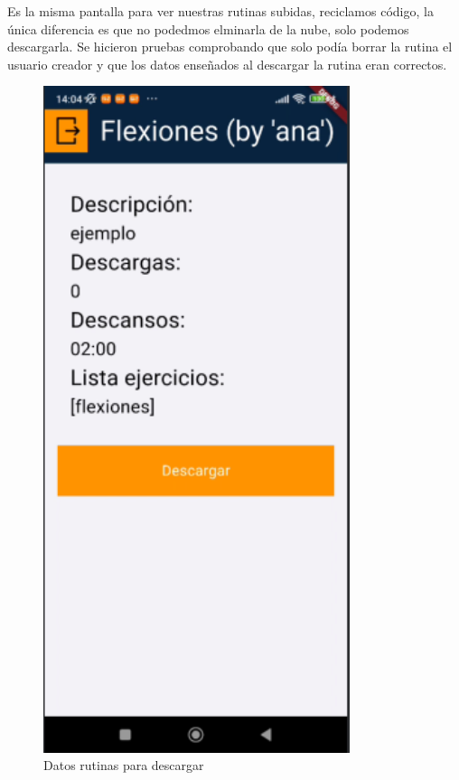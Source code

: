 Es la misma pantalla para ver nuestras rutinas subidas, reciclamos código, la única diferencia es que no podedmos elminarla de la nube, solo podemos descargarla. Se hicieron pruebas comprobando que solo podía borrar la rutina el usuario creador y que los datos enseñados al descargar la rutina eran correctos.

\begin{figure}[H]
   \centering
    \includegraphics[width=0.8\textwidth]{pantallas/datosRutinasDesc.png}
    \caption{Datos rutinas para descargar}
    \label{fig:datosRutinasDesc}
\end{figure}


